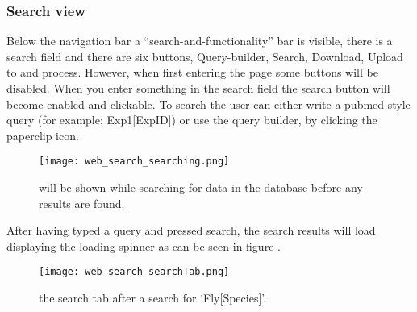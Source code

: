 \subsubsection{Search view}

Below the navigation bar a “search-and-functionality” bar is visible, there is a search field and there are six buttons, Query-builder, Search, Download, Upload to and process. However, when first entering the page some buttons will be disabled. When you enter something in the search field the search button will become enabled and clickable. To search the user can either write a pubmed style query (for example: Exp1[ExpID]) or use the query builder, by clicking the paperclip icon.

\begin{figure}[h]
\centering
\texttt{[image: web\_search\_searching.png]}
\caption{\label{fig:web_search_searching}will be shown while searching for data in the database before any results are found.}
\end{figure}

After having typed a query and pressed search, the search results will load displaying the loading spinner as can be seen in figure .
\begin{figure}[h]
\centering
\texttt{[image: web\_search\_searchTab.png]}
\caption{\label{fig:web_search_searchTab}the search tab after a search for ‘Fly[Species]’.}
\end{figure}

